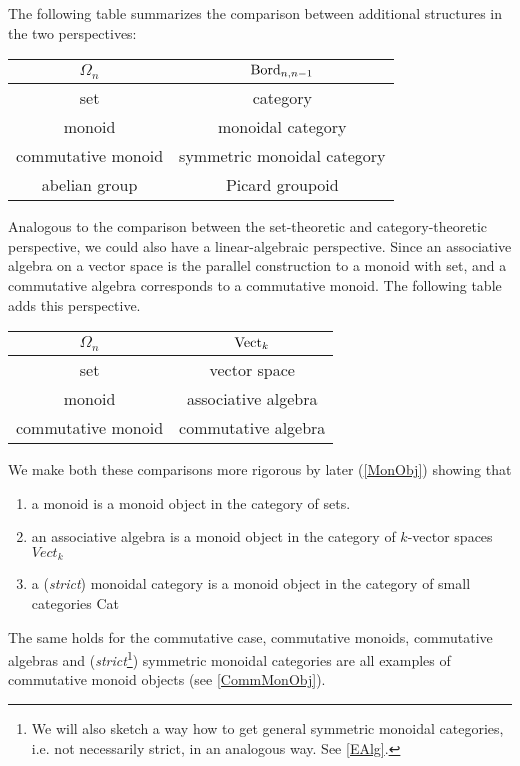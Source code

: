 The following table summarizes the comparison between additional structures in the two perspectives:

\begin{center}
    \begin{tabular}{||c|c||}
    \hline
        $\Omega_n$ & $\operatorname{Bord}_{n,n-1}$ \\ [0.5ex]
         \hline\hline
         set & category \\
         \hline
         monoid & monoidal category \\
         \hline
         commutative monoid & symmetric monoidal category \\
         \hline
         abelian group & Picard groupoid \\
         \hline
    \end{tabular}
\end{center}
Analogous to the comparison between the set-theoretic and category-theoretic perspective, we could also have a linear-algebraic perspective. Since an associative algebra on a vector space is the parallel construction to a monoid with set, and a commutative algebra corresponds to a commutative monoid. The following table adds this perspective.
\begin{center}
    \begin{tabular}{||c|c||}
    \hline
        $\Omega_n$ & $\operatorname{Vect}_k$ \\ [0.5ex]
         \hline\hline
         set & vector space\\
         \hline
         monoid & associative algebra \\
         \hline
         commutative monoid & commutative algebra \\
         \hline
    \end{tabular}
\end{center}
We make both these comparisons more rigorous by later (\ref{MonObj}) showing that
\begin{enumerate}
    \item a monoid is a monoid object in the category of sets.
    \item an associative algebra is a monoid object in the category of $k$-vector spaces $Vect_k$
    \item a (\emph{strict}) monoidal category is a monoid object in the category of small categories Cat
\end{enumerate} 
The same holds for the commutative case, commutative monoids, commutative algebras and (\emph{strict}\footnote{We will also sketch a way how to get general symmetric monoidal categories, i.e. not necessarily strict, in an analogous way. See \ref{EAlg}.}) 
symmetric monoidal categories are all examples of commutative monoid objects (see \ref{CommMonObj}).